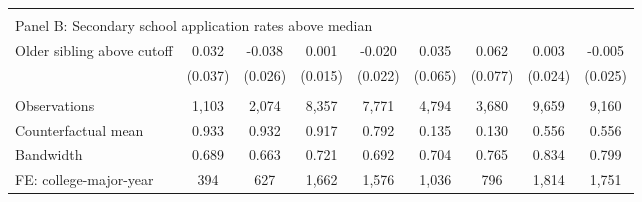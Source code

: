 {{\begin{tabular}{lcccccccc}
&  &  &  & & & & & &    \\
\multicolumn{9}{l}{Panel B: Secondary school application rates above median} \\
Older sibling above cutoff&       0.032   &      -0.038   &       0.001   &      -0.020   &       0.035   &       0.062   &       0.003   &      -0.005   \\
                    &     (0.037)   &     (0.026)   &     (0.015)   &     (0.022)   &     (0.065)   &     (0.077)   &     (0.024)   &     (0.025)   \\
                    &               &               &               &               &               &               &               &               \\
Observations        &       1,103   &       2,074   &       8,357   &       7,771   &       4,794   &       3,680   &       9,659   &       9,160   \\
Counterfactual mean &       0.933   &       0.932   &       0.917   &       0.792   &       0.135   &       0.130   &       0.556   &       0.556   \\
Bandwidth           &       0.689   &       0.663   &       0.721   &       0.692   &       0.704   &       0.765   &       0.834   &       0.799   \\
FE: college-major-year&         394   &         627   &       1,662   &       1,576   &       1,036   &         796   &       1,814   &       1,751   \\
 

\bottomrule
\end{tabular}
}
}
